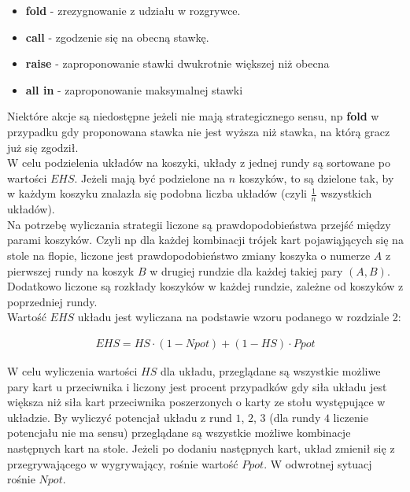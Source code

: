 \documentclass[licencjacka]{pracamgr}
\begin{document}
\begin{itemize}
\item \textbf{fold} - zrezygnowanie z udziału w rozgrywce.
\item \textbf{call} - zgodzenie się na obecną stawkę.
\item \textbf{raise} - zaproponowanie stawki dwukrotnie większej niż obecna
\item \textbf{all in} - zaproponowanie maksymalnej stawki
\end{itemize}

\noindent
Niektóre akcje są niedostępne jeżeli nie mają strategicznego sensu, np \textbf{fold} w przypadku gdy
proponowana stawka nie jest wyższa niż stawka, na którą gracz już się zgodził. \\

\noindent
W celu podzielenia układów na koszyki, układy z jednej rundy są sortowane po wartości $EHS$. Jeżeli mają być podzielone na
$n$ koszyków, to są dzielone tak, by w każdym koszyku znalazła się podobna liczba układów (czyli $\frac{1}{n}$ wszystkich układów). \\

\noindent
Na potrzebę wyliczania strategii liczone są prawdopodobieństwa przejść między parami koszyków. Czyli np dla każdej kombinacji
trójek kart pojawiąjących się na stole na flopie, liczone jest prawdopodobieństwo zmiany koszyka o numerze $A$ z pierwszej
rundy na koszyk $B$ w drugiej rundzie dla każdej takiej pary $(A, B)$. Dodatkowo liczone są rozkłady koszyków
w każdej rundzie, zależne od koszyków z poprzedniej rundy. \\

\noindent
Wartość $EHS$ układu jest wyliczana na podstawie wzoru podanego w rozdziale 2:

\begin{align*}
EHS = HS \cdot (1 - Npot) + (1 - HS) \cdot Ppot
\end{align*}

\noindent
W celu wyliczenia wartości $HS$ dla układu, przeglądane są wszystkie możliwe pary kart u przeciwnika i liczony jest procent
przypadków gdy siła układu jest większa niż siła kart przeciwnika poszerzonych o karty ze stołu występujące w układzie.
By wyliczyć potencjał układu z rund $1$, $2$, $3$ (dla rundy $4$ liczenie potencjału nie ma sensu) przeglądane są wszystkie
możliwe kombinacje następnych kart na stole. Jeżeli po dodaniu następnych kart, układ zmienił się z przegrywającego w
wygrywający, rośnie wartość $Ppot$. W odwrotnej sytuacj rośnie $Npot$.
\end{document}
